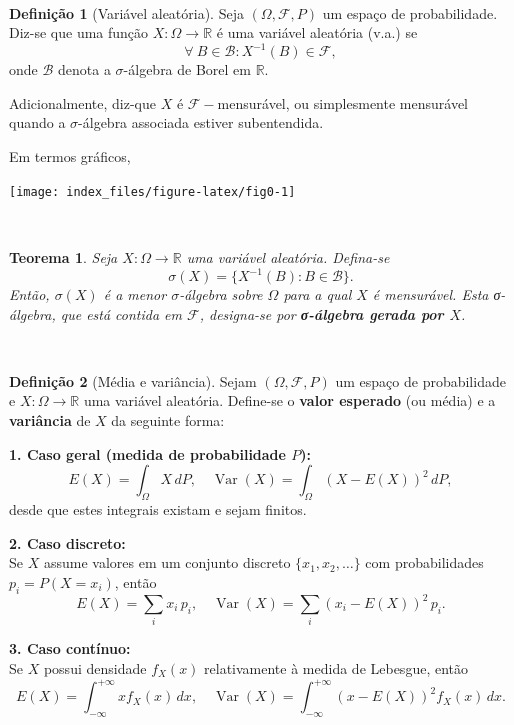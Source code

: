 \documentclass[
  11pt,
  a4paper,
]{book}
\newtheorem{theorem}{Teorema}[chapter]
\theoremstyle{definition}
\newtheorem{definition}{Definição}[chapter]
\theoremstyle{definition}
\theoremstyle{definition}
\theoremstyle{definition}
\theoremstyle{remark}
\begin{document}
\(\,\)

\begin{definition}[Variável aleatória]

Seja \((\Omega,\mathcal{F},P)\) um espaço de probabilidade. Diz-se que uma função \(X:\Omega \rightarrow \mathbb{R}\) é uma variável aleatória (v.a.) se
\[
\forall ~ B \in \mathcal{B}: X^{-1}(B) \in \mathcal{F},
\]
onde \(\mathcal{B}\) denota a \(\sigma\)-álgebra de Borel em \(\mathbb{R}\).

Adicionalmente, diz-que \(X\) é \(\mathcal{F}-\)mensurável, ou simplesmente mensurável quando a \(\sigma\)-álgebra associada estiver subentendida.

Em termos gráficos,

\begin{center}\texttt{[image: index\_files/figure-latex/fig0-1]} \end{center}

\end{definition}

\(\,\)

\begin{theorem}
Seja \(X:\Omega \to \mathbb{R}\) uma variável aleatória. Defina-se
\[
\sigma(X) = \{ X^{-1}(B) : B \in \mathcal{B} \}.
\]
Então, \(\sigma(X)\) é a menor \(\sigma\)-álgebra sobre \(\Omega\) para a qual \(X\) é mensurável. Esta σ-álgebra, que está contida em \(\mathcal{F}\), designa-se por \textbf{σ-álgebra gerada por \(X\)}.
\end{theorem}

\(\,\)

\begin{definition}[Média e variância]
Sejam \((\Omega,\mathcal{F},P)\) um espaço de probabilidade e \(X:\Omega \rightarrow \mathbb{R}\) uma variável aleatória. Define-se o \textbf{valor esperado} (ou média) e a \textbf{variância} de \(X\) da seguinte forma:

\textbf{1. Caso geral (medida de probabilidade \(P\)):}
\[
E(X) = \int_\Omega X \, dP, \quad 
\operatorname{Var}(X) = \int_\Omega (X - E(X))^2 \, dP,
\]
desde que estes integrais existam e sejam finitos.

\textbf{2. Caso discreto:}\\
Se \(X\) assume valores em um conjunto discreto \(\{x_1, x_2, \dots\}\) com probabilidades \(p_i = P(X=x_i)\), então
\[
E(X) = \sum_i x_i \, p_i, \quad 
\operatorname{Var}(X) = \sum_i (x_i - E(X))^2 \, p_i.
\]

\textbf{3. Caso contínuo:}\\
Se \(X\) possui densidade \(f_X(x)\) relativamente à medida de Lebesgue, então
\[
E(X) = \int_{-\infty}^{+\infty} x f_X(x) \, dx, \quad 
\operatorname{Var}(X) = \int_{-\infty}^{+\infty} (x - E(X))^2 f_X(x) \, dx.
\]
\end{definition}
\end{document}
